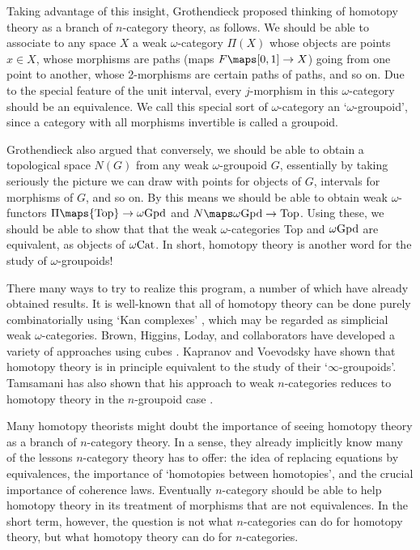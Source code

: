 Taking advantage of this insight, Grothendieck \cite{Gro} proposed
thinking of homotopy theory as a branch of $n$-category theory, as
follows.  We should be able to associate to any space $X$ a weak
$\omega$-category $\Pi(X)$ whose objects are points $x \in X$, whose
morphisms are paths (maps $F \maps [0,1] \to X$) going from one
point to another, whose 2-morphisms are certain paths of paths, and so
on.  Due to the special feature of the unit interval, every
$j$-morphism in this $\omega$-category should be an equivalence.
We call this special sort of $\omega$-category an `$\omega$-groupoid',
since a category with all morphisms invertible is called a groupoid.

Grothendieck also argued that conversely, we should be able to obtain a
topological space $N(G)$ from any weak $\omega$-groupoid $G$,
essentially by taking seriously the picture we can draw with points for
objects of $G$, intervals for morphisms of $G$, and so on.  By this
means we should be able to obtain weak $\omega$-functors $\Pi \maps {\rm
Top} \to \omega{\rm Gpd}$ and $N \maps \omega{\rm Gpd} \to {\rm Top}$.
Using these, we should be able to show that that the weak
$\omega$-categories Top and $\omega{\rm Gpd}$ are equivalent, as objects
of $\omega{\rm Cat}$.  In short, homotopy theory is another word for the
study of $\omega$-groupoids!

There many ways to try to realize this program, a number of which have
already obtained results.  It is well-known that all of homotopy theory
can be done purely combinatorially using `Kan complexes' \cite{May},
which may be regarded as simplicial weak $\omega$-categories.  Brown,
Higgins, Loday, and collaborators have developed a variety of approaches
using cubes \cite{Brown}.  Kapranov and Voevodsky \cite{KVinfinity} have
shown that homotopy theory is in principle equivalent to the study of
their `$\infty$-groupoids'.  Tamsamani has also shown that his approach to
weak $n$-categories reduces to homotopy theory in the $n$-groupoid case
\cite{Tamsamani2}.

Many homotopy theorists might doubt the importance of seeing homotopy
theory as a branch of $n$-category theory.  In a sense, they already
implicitly know many of the lessons $n$-category theory has to offer:
the idea of replacing equations by equivalences, the importance of
`homotopies between homotopies', and the crucial importance of coherence
laws.  Eventually $n$-category should be able to help homotopy theory in
its treatment of morphisms that are not equivalences.  In the short
term, however, the question is not what $n$-categories can do for
homotopy theory, but what homotopy theory can do for $n$-categories.

